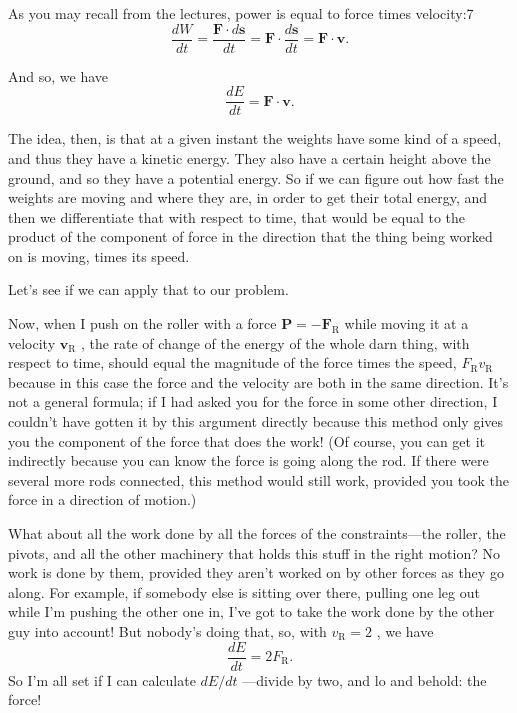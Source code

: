 \documentclass[11pt,oneside]{article}
\providecommand{\ddt}[2]{\frac{d#1}{d#2}}
\providecommand{\FLPF}{\mathbf{F}}
\providecommand{\FLPP}{\mathbf{P}}
\providecommand{\FLPs}{\mathbf{s}}
\providecommand{\FLPv}{\mathbf{v}}
\begin{document}
As you may recall from the lectures, power is equal to force times velocity:7 
\begin{equation*} \tag{2.22}
\label{Eq:TIPS:2:22} \ddt{W}{t} =\frac{\FLPF\cdot d\FLPs}{dt} = \FLPF\cdot\ddt{\FLPs}{t} = \FLPF\cdot\FLPv. \end{equation*}
\par

And so, we have 
\begin{equation*} \tag{2.23}
\label{Eq:TIPS:2:23} \ddt{E}{t} = \FLPF\cdot\FLPv. \end{equation*}
\par

The idea, then, is that at a given instant the weights have some kind of a speed, and thus they have a kinetic energy. They also have a certain height above the ground, and so they have a potential energy. So if we can figure out how fast the weights are moving and where they are, in order to get their total energy, and then we differentiate that with respect to time, that would be equal to the product of the component of force in the direction that the thing being worked on is moving, times its speed.\par

Let's see if we can apply that to our problem.\par

Now, when I push on the roller with a force \(\FLPP = -\FLPF_\text{R}\) while moving it at a velocity \(\FLPv_\text{R}\) , the rate of change of the energy of the whole darn thing, with respect to time, should equal the magnitude of the force times the speed, \(F_\text{R}v_\text{R}\) because in this case the force and the velocity are both in the same direction. It's not a general formula; if I had asked you for the force in some other direction, I couldn't have gotten it by this argument directly because this method only gives you the component of the force that does the work! (Of course, you can get it indirectly because you can know the force is going along the rod. If there were several more rods connected, this method would still work, provided you took the force in a direction of motion.)\par

What about all the work done by all the forces of the constraints---the roller, the pivots, and all the other machinery that holds this stuff in the right motion? No work is done by them, provided they aren't worked on by other forces as they go along. For example, if somebody else is sitting over there, pulling one leg out while I'm pushing the other one in, I've got to take the work done by the other guy into account! But nobody's doing that, so, with \(v_\text{R} = 2\) , we have 
\begin{equation*} \tag{2.24}
\label{Eq:TIPS:2:24} \ddt{E}{t} = 2F_\text{R}. \end{equation*}
 So I'm all set if I can calculate \(dE/dt\) ---divide by two, and lo and behold: the force!\par
\end{document}

